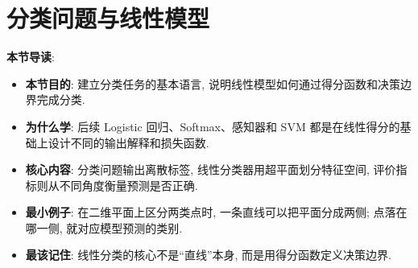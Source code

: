 \documentclass{../nndlcourse}
\begin{document}
\section{分类问题与线性模型}
\textbf{本节导读}:
\begin{itemize}
    \item \textbf{本节目的}: 建立分类任务的基本语言, 说明线性模型如何通过得分函数和决策边界完成分类.
    \item \textbf{为什么学}: 后续 Logistic 回归、Softmax、感知器和 SVM 都是在线性得分的基础上设计不同的输出解释和损失函数.
    \item \textbf{核心内容}: 分类问题输出离散标签, 线性分类器用超平面划分特征空间, 评价指标则从不同角度衡量预测是否正确.
    \item \textbf{最小例子}: 在二维平面上区分两类点时, 一条直线可以把平面分成两侧; 点落在哪一侧, 就对应模型预测的类别.
    \item \textbf{最该记住}: 线性分类的核心不是“直线”本身, 而是用得分函数定义决策边界.
\end{itemize}
\end{document}
